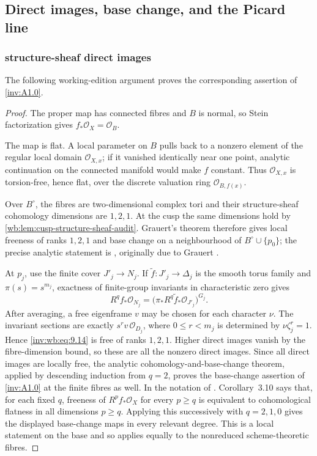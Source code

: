 \subsection{Direct images, base change, and the Picard line}

\subsubsection{structure-sheaf direct images}\label{inv:wbproof:thm:structure-direct-images-audit}
The following working-edition argument proves the corresponding assertion of \cref{inv:A1.0}.


\begin{proof}
The proper map has connected fibres and \(B\) is normal, so Stein
factorization gives \(f_*\mathcal O_X=\mathcal O_B\).

The map is flat.  A local parameter on \(B\) pulls back to a nonzero
element of the regular local domain \(\mathcal O_{X,x}\); if it vanished
identically near one point, analytic continuation on the connected
manifold would make \(f\) constant.  Thus \(\mathcal O_{X,x}\) is
torsion-free, hence flat, over the discrete valuation ring
\(\mathcal O_{B,f(x)}\).

Over \(B^\circ\), the fibres are two-dimensional complex tori and their
structure-sheaf cohomology dimensions are \(1,2,1\).  At the cusp the same
dimensions hold by \cref{wb:lem:cusp-structure-sheaf-audit}.  Grauert's
theorem therefore gives local freeness of ranks \(1,2,1\) and base change
on a neighbourhood of \(B^\circ\cup\{p_0\}\); the precise analytic statement is
\cite[Chapter~III, \S4, Theorem~4.12]{BS76}, originally due to
Grauert \cite{Grauert1960}.

At \(p_j\), use the finite cover \(J'_j\to N_j\).  If
\(\widetilde f:J'_j\to\Delta_j\) is the smooth torus family and
\(\pi(s)=s^{m_j}\), exactness of finite-group invariants in characteristic
zero gives
\[
 R^qf_*\mathcal O_{N_j}
 =\bigl(\pi_*R^q\widetilde f_*\mathcal O_{J'_j}\bigr)^{G_j}.
\tag{WBA.9.14}\label{inv:wb:eq:9.14}
\]
After averaging, a free eigenframe \(v\) may be chosen for each character
\(\nu\).  The invariant sections are exactly
\(s^rv\,\mathcal O_{D_j}\), where \(0\le r<m_j\) is determined by
\(\nu\zeta_j^r=1\).  Hence \eqref{inv:wb:eq:9.14} is free of ranks \(1,2,1\).
Higher direct images vanish by the fibre-dimension bound, so these are all
the nonzero direct images.  Since all direct images are locally free, the analytic
cohomology-and-base-change theorem, applied by descending induction from
\(q=2\), proves the base-change assertion of \cref{inv:A1.0} at the finite fibres as well.  In the notation of
\cite[Chapter~III, \S3, Theorem~3.4, Corollaries~3.5, 3.7, and 3.10]
  {BS76}.  Corollary~3.10 says that, for each fixed \(q\),
  freeness of \(R^p f_*\mathcal O_X\) for every \(p\ge q\) is equivalent to
  cohomological flatness in all dimensions \(p\ge q\).  Applying this
  successively with \(q=2,1,0\) gives the displayed base-change maps in every
  relevant degree.  This is a local statement on the base and so applies
  equally to the nonreduced scheme-theoretic fibres.


\end{proof}
